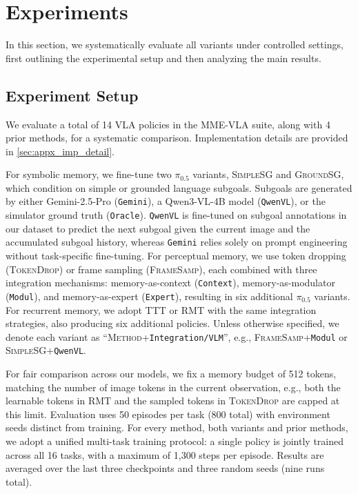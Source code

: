 \section{Experiments}
\label{sec:experiments}

In this section, we systematically evaluate all \modelname\xspace variants under controlled settings, first outlining the experimental setup and then analyzing the main results.

\subsection{Experiment Setup}
We evaluate a total of 14 VLA policies in the MME-VLA suite, along with 4 prior methods, for a systematic comparison. Implementation details are provided in \cref{sec:appx_imp_detail}.

\noindent{\bf \modelname\xspace Suite.}
For symbolic memory, we fine-tune two $\pi_{0.5}$ variants, \textsc{SimpleSG} and \textsc{GroundSG}, which condition on simple or grounded language subgoals. Subgoals are generated by either Gemini-2.5-Pro (\texttt{Gemini}), a Qwen3-VL-4B model (\texttt{QwenVL}), or the simulator ground truth (\texttt{Oracle}).
\texttt{QwenVL} is fine-tuned on subgoal annotations in our dataset to predict the next subgoal given the current image and the accumulated subgoal history, whereas \texttt{Gemini} relies solely on prompt engineering without task-specific fine-tuning.
For perceptual memory, we use token dropping (\textsc{TokenDrop}) or frame sampling (\textsc{FrameSamp}), each combined with three integration mechanisms: memory-as-context (\texttt{Context}), memory-as-modulator (\texttt{Modul}), and memory-as-expert (\texttt{Expert}), resulting in six additional $\pi_{0.5}$ variants.
For recurrent memory, we adopt \textsc{TTT} or \textsc{RMT} with the same integration strategies, also  producing six additional policies.
Unless otherwise specified, we denote each variant as ``\textsc{Method}+\texttt{Integration/VLM}'', e.g., \textsc{FrameSamp}+\texttt{Modul} or \textsc{SimpleSG}+\texttt{QwenVL}.

For fair comparison across our \modelname\xspace models, we fix a memory budget of 512 tokens, matching the number of image tokens in the current observation, e.g., both the learnable tokens in \textsc{RMT} and the sampled tokens in \textsc{TokenDrop} are capped at this limit.
Evaluation uses 50 episodes per task (800 total) with environment seeds distinct from training. For every method, both \modelname\xspace variants and prior methods, we adopt a unified multi-task training protocol: a single policy is jointly trained across all 16 tasks, with a maximum of 1,300 steps per episode. Results are averaged over the last three checkpoints and three random seeds (nine runs total).

